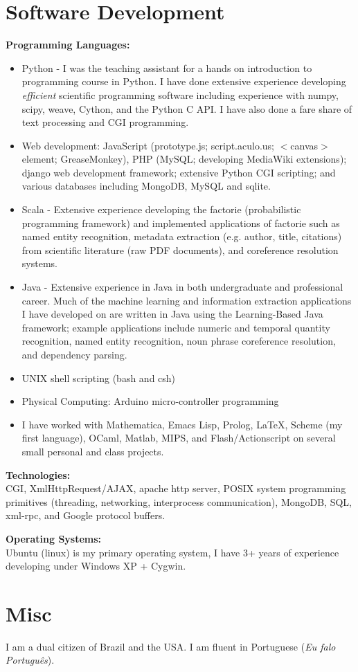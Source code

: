 \documentclass{report}
\begin{document}
\section*{Software Development}
{\bf Programming Languages:}
\begin{itemize}
\item Python - I was the teaching assistant for a hands on introduction to programming course in Python. I have done extensive experience developing \emph{efficient} scientific programming software including experience with numpy, scipy, weave, Cython, and the Python C API. I have also done a fare share of text processing and CGI programming.
\item Web development: JavaScript (prototype.js; script.aculo.us; $<$canvas$>$ element; GreaseMonkey), PHP (MySQL; developing MediaWiki extensions); django web development framework; extensive Python CGI scripting; and various databases including  MongoDB, MySQL and sqlite.
\item Scala - Extensive experience developing the factorie (probabilistic programming framework) and implemented applications of factorie such as named entity recognition, metadata extraction (e.g. author, title, citations) from scientific literature (raw PDF documents), and coreference resolution systems.
\item Java - Extensive experience in Java in both undergraduate and professional career. Much of the machine learning and information extraction applications I have developed on are written in Java using the Learning-Based Java framework; example applications include numeric and temporal quantity recognition, named entity recognition, noun phrase coreference resolution, and dependency parsing.
\item UNIX shell scripting (bash and csh)
\item Physical Computing: Arduino micro-controller programming
\item I have worked with Mathematica, Emacs Lisp, Prolog, \LaTeX, Scheme (my first language), OCaml, Matlab, MIPS, and Flash/Actionscript on several small personal and class projects.
\end{itemize}

{\bf Technologies:} \\
CGI, XmlHttpRequest/AJAX, apache http server, POSIX system programming primitives (threading, networking, interprocess communication), MongoDB, SQL, xml-rpc, and Google protocol buffers. \\ \vspace{-18pt}

{\bf Operating Systems:} \\
Ubuntu (linux) is my primary operating system, I have 3+ years of experience developing under Windows XP + Cygwin. \\


\section*{Misc}
I am a dual citizen of Brazil and the USA. I am fluent in Portuguese (\emph{Eu falo Portugu\^{e}s}).
\end{document}
